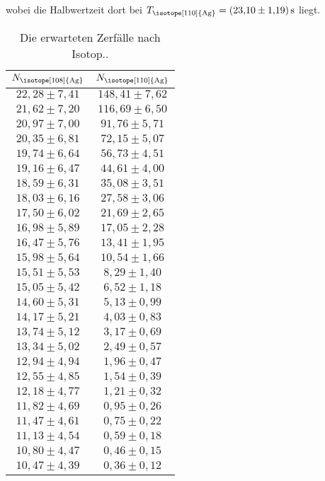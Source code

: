 wobei die Halbwertzeit dort bei $T_\text{\isotope[110]{Ag}}=\qty{23.1(1.19)}{\second}$ liegt.
\begin{table}[H]
  \centering
  \caption{Die erwarteten Zerfälle nach Isotop..}
  \label{tab:Nsi2}
  \begin{tabular}{c c}
      \toprule
      {$N_\text{\isotope[108]{Ag}}$}&{$N_\text{\isotope[110]{Ag}}$}\\
      \midrule
      $22,28 \pm 7,41$ & $148,41 \pm 7,62$ \\
      $21,62 \pm 7,20$ & $116,69 \pm 6,50$ \\
      $20,97 \pm 7,00$ & $91,76 \pm 5,71$ \\
      $20,35 \pm 6,81$ & $72,15 \pm 5,07$ \\
      $19,74 \pm 6,64$ & $56,73 \pm 4,51$ \\
      $19,16 \pm 6,47$ & $44,61 \pm 4,00$ \\
      $18,59 \pm 6,31$ & $35,08 \pm 3,51$ \\
      $18,03 \pm 6,16$ & $27,58 \pm 3,06$ \\
      $17,50 \pm 6,02$ & $21,69 \pm 2,65$ \\
      $16,98 \pm 5,89$ & $17,05 \pm 2,28$ \\
      $16,47 \pm 5,76$ & $13,41 \pm 1,95$ \\
      $15,98 \pm 5,64$ & $10,54 \pm 1,66$ \\
      $15,51 \pm 5,53$ & $8,29 \pm 1,40$ \\
      $15,05 \pm 5,42$ & $6,52 \pm 1,18$ \\
      $14,60 \pm 5,31$ & $5,13 \pm 0,99$ \\
      $14,17 \pm 5,21$ & $4,03 \pm 0,83$ \\
      $13,74 \pm 5,12$ & $3,17 \pm 0,69$ \\
      $13,34 \pm 5,02$ & $2,49 \pm 0,57$ \\
      $12,94 \pm 4,94$ & $1,96 \pm 0,47$ \\
      $12,55 \pm 4,85$ & $1,54 \pm 0,39$ \\
      $12,18 \pm 4,77$ & $1,21 \pm 0,32$ \\
      $11,82 \pm 4,69$ & $0,95 \pm 0,26$ \\
      $11,47 \pm 4,61$ & $0,75 \pm 0,22$ \\
      $11,13 \pm 4,54$ & $0,59 \pm 0,18$ \\
      $10,80 \pm 4,47$ & $0,46 \pm 0,15$ \\
      $10,47 \pm 4,39$ & $0,36 \pm 0,12$ \\

\end{tabular}
\end{table}
